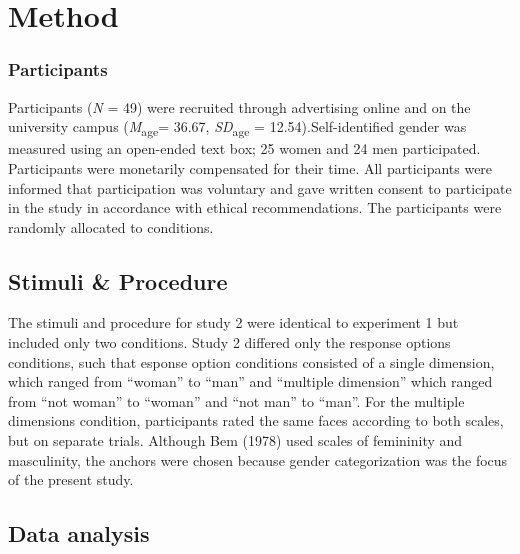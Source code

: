 \documentclass[
  man]{apa7}
\begin{document}
\hypertarget{method-1}{%
\section{Method}\label{method-1}}

\hypertarget{participants-1}{%
\subsubsection{Participants}\label{participants-1}}

Participants (\emph{N} = 49) were recruited through advertising online and on the university campus (\emph{M}\textsubscript{age}= 36.67, \emph{SD}\textsubscript{age} = 12.54).Self-identified gender was measured using an open-ended text box; 25 women and 24 men participated. Participants were monetarily compensated for their time. All participants were informed that participation was voluntary and gave written consent to participate in the study in accordance with ethical recommendations. The participants were randomly allocated to conditions.

\hypertarget{stimuli-procedure}{%
\subsection{Stimuli \& Procedure}\label{stimuli-procedure}}

The stimuli and procedure for study 2 were identical to experiment 1 but included only two conditions. Study 2 differed only the response options conditions, such that esponse option conditions consisted of a single dimension, which ranged from ``woman'' to ``man'' and ``multiple dimension'' which ranged from ``not woman'' to ``woman'' and ``not man'' to ``man''. For the multiple dimensions condition, participants rated the same faces according to both scales, but on separate trials. Although Bem (1978) used scales of femininity and masculinity, the anchors were chosen because gender categorization was the focus of the present study.

\hypertarget{data-analysis-1}{%
\subsection{Data analysis}\label{data-analysis-1}}
\end{document}
